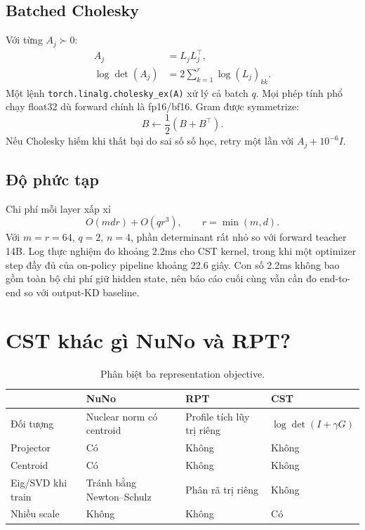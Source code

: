 \documentclass{article}
\begin{document}
\subsection{Batched Cholesky}

Với từng $A_j\succ0$:
\begin{align}
 A_j&=L_jL_j^\top,\\
 \log\det(A_j)
 &=2\sum_{k=1}^{r}\log(L_j)_{kk}.
 \label{eq:cholesky}
\end{align}
Một lệnh \texttt{torch.linalg.cholesky\_ex(A)} xử lý cả batch $q$.  Mọi phép
tính phổ chạy float32 dù forward chính là fp16/bf16.  Gram được symmetrize:
\begin{equation}
 B\leftarrow\frac12(B+B^\top).
\end{equation}
Nếu Cholesky hiếm khi thất bại do sai số số học, retry một lần với
$A_j+10^{-6}I$.

\subsection{Độ phức tạp}

Chi phí mỗi layer xấp xỉ
\begin{equation}
 O(mdr)+O(qr^3),\qquad r=\min(m,d).
\end{equation}
Với $m=r=64$, $q=2$, $n=4$, phần determinant rất nhỏ so với forward teacher
14B.  Log thực nghiệm đo khoảng 2.2ms cho CST kernel, trong khi một optimizer
step đầy đủ của on-policy pipeline khoảng 22.6 giây.  Con số 2.2ms không bao
gồm toàn bộ chi phí giữ hidden state, nên báo cáo cuối cùng vẫn cần đo end-to-end
so với output-KD baseline.

\section{CST khác gì NuNo và RPT?}

\begin{table}[t]
\caption{Phân biệt ba representation objective.}
\label{tab:compare}
\centering
\footnotesize
\setlength{\tabcolsep}{2pt}
\begin{tabular}{>{\raggedright\arraybackslash}p{2.1cm}
                >{\raggedright\arraybackslash}p{3.4cm}
                >{\raggedright\arraybackslash}p{3.4cm}
                >{\raggedright\arraybackslash}p{3.4cm}}
\toprule
 & NuNo & RPT & CST\\
\midrule
Đối tượng & Nuclear norm có centroid & Profile tích lũy trị riêng &
$\log\det(I+\gamma G)$\\
Projector & Có & Không & Không\\
Centroid & Có & Không & Không\\
Eig/SVD khi train & Tránh bằng Newton--Schulz & Phân rã trị riêng & Không\\
Nhiều scale & Không & Không & Có\\
\bottomrule
\end{tabular}
\end{table}
\end{document}
